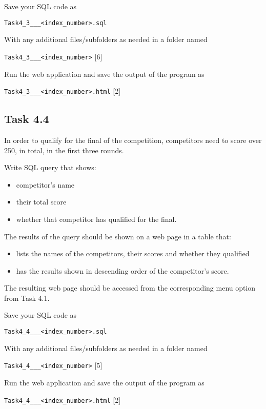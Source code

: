 Save your SQL code as

\texttt{Task4\_3\_<your name>\_<centre number>\_<index\_number>.sql}

With any additional files/subfolders as needed in a folder named

\texttt{Task4\_3\_<your name>\_<centre number>\_<index\_number>} \hfill{}{[}6{]}

Run the web application and save the output of the program as

\texttt{Task4\_3\_<your name>\_<centre number>\_<index\_number>.html}
\hfill{}{[}2{]}

\subsection*{Task 4.4 }

In order to qualify for the final of the competition, competitors
need to score over 250, in total, in the first three rounds. 

Write SQL query that shows:
\begin{itemize}
\item competitor\textquoteright s name
\item their total score
\item whether that competitor has qualified for the final.
\end{itemize}
The results of the query should be shown on a web page in a table
that:
\begin{itemize}
\item lists the names of the competitors, their scores and whether they
qualified
\item has the results shown in descending order of the competitor's score.
\end{itemize}
The resulting web page should be accessed from the corresponding menu
option from Task 4.1.

Save your SQL code as

\texttt{Task4\_4\_<your name>\_<centre number>\_<index\_number>.sql}

With any additional files/subfolders as needed in a folder named

\texttt{Task4\_4\_<your name>\_<centre number>\_<index\_number>} \hfill{}{[}5{]}

Run the web application and save the output of the program as

\texttt{Task4\_4\_<your name>\_<centre number>\_<index\_number>.html}
\hfill{}{[}2{]}
